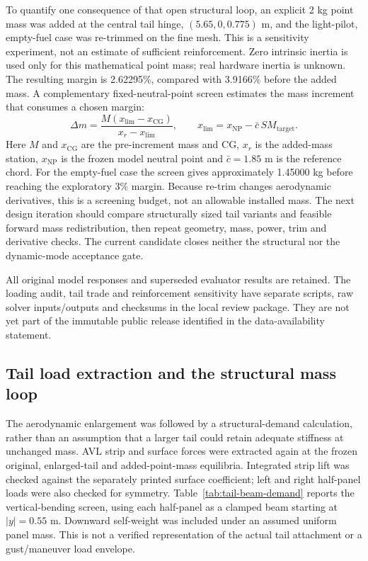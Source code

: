 \documentclass[11pt,a4paper]{article}
\begin{document}
To quantify one consequence of that open structural loop, an explicit
2 kg point mass was added at the central tail hinge, $(5.65,0,0.775)$ m,
and the light-pilot, empty-fuel case was re-trimmed on the fine mesh. This is
a sensitivity experiment, not an estimate of sufficient reinforcement.
Zero intrinsic inertia is used only for this mathematical point mass; real
hardware inertia is unknown. The resulting margin is 2.62295\%, compared
with 3.9166\% before the added mass. A complementary fixed-neutral-point
screen estimates the mass increment that consumes a chosen margin:
\begin{equation}
 \Delta m = \frac{M(x_{\mathrm{lim}}-x_{\mathrm{CG}})}
 {x_r-x_{\mathrm{lim}}},\qquad
 x_{\mathrm{lim}}=x_{\mathrm{NP}}-\bar c\,SM_{\mathrm{target}}.
\label{eq:tail-mass-budget}
\end{equation}
Here $M$ and $x_{\mathrm{CG}}$ are the pre-increment mass and CG, $x_r$ is the
added-mass station, $x_{\mathrm{NP}}$ is the frozen model neutral point and
$\bar c=1.85$ m is the reference chord. For the empty-fuel case the screen
gives approximately 1.45000 kg before reaching the exploratory 3\% margin.
Because re-trim changes aerodynamic derivatives, this is a screening budget,
not an allowable installed mass. The next design iteration should compare
structurally sized tail variants and feasible forward mass redistribution,
then repeat geometry, mass, power, trim and derivative checks. The current
candidate closes neither the structural nor the dynamic-mode acceptance gate.

All original model responses and superseded evaluator results are retained.
The loading audit, tail trade and reinforcement sensitivity have separate
scripts, raw solver inputs/outputs and checksums in the local review package.
They are not yet part of the immutable public release identified in the
data-availability statement.


\subsection{Tail load extraction and the structural mass loop}
\label{sec:tail-structural-loop}

The aerodynamic enlargement was followed by a structural-demand calculation,
rather than an assumption that a larger tail could retain adequate stiffness
at unchanged mass. AVL strip and surface forces were extracted again at the
frozen original, enlarged-tail and added-point-mass equilibria. Integrated
strip lift was checked against the separately printed surface coefficient;
left and right half-panel loads were also checked for symmetry. Table~\ref{tab:tail-beam-demand}
reports the vertical-bending screen, using each half-panel as a clamped beam
starting at $|y|=0.55$ m. Downward self-weight was included under an assumed
uniform panel mass. This is not a verified representation of the actual
tail attachment or a gust/maneuver load envelope.
\end{document}
